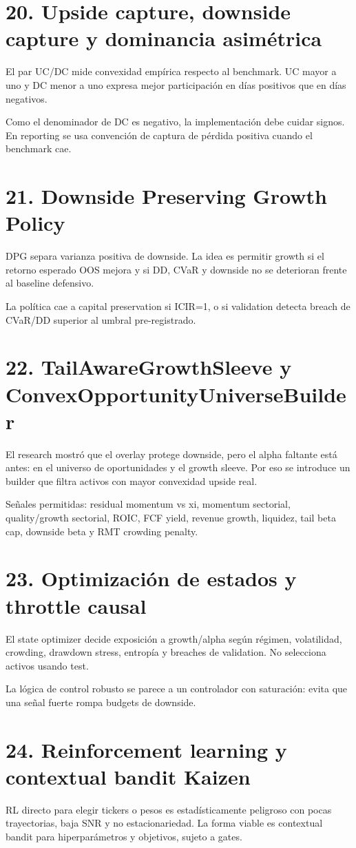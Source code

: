 \documentclass[11pt,letterpaper]{article}
\begin{document}
\section{20. Upside capture, downside capture y dominancia asimétrica}
El par UC/DC mide convexidad empírica respecto al benchmark. UC mayor a uno y DC menor a uno expresa mejor participación en días positivos que en días negativos.

Como el denominador de DC es negativo, la implementación debe cuidar signos. En reporting se usa convención de captura de pérdida positiva cuando el benchmark cae.

\section{21. Downside Preserving Growth Policy}
DPG separa varianza positiva de downside. La idea es permitir growth si el retorno esperado OOS mejora y si DD, CVaR y downside no se deterioran frente al baseline defensivo.

La política cae a capital preservation si ICIR=1, o si validation detecta breach de CVaR/DD superior al umbral pre-registrado.

\section{22. TailAwareGrowthSleeve y ConvexOpportunityUniverseBuilder}
El research mostró que el overlay protege downside, pero el alpha faltante está antes: en el universo de oportunidades y el growth sleeve. Por eso se introduce un builder que filtra activos con mayor convexidad upside real.

Señales permitidas: residual momentum vs xi, momentum sectorial, quality/growth sectorial, ROIC, FCF yield, revenue growth, liquidez, tail beta cap, downside beta y RMT crowding penalty.

\section{23. Optimización de estados y throttle causal}
El state optimizer decide exposición a growth/alpha según régimen, volatilidad, crowding, drawdown stress, entropía y breaches de validation. No selecciona activos usando test.

La lógica de control robusto se parece a un controlador con saturación: evita que una señal fuerte rompa budgets de downside.

\section{24. Reinforcement learning y contextual bandit Kaizen}
RL directo para elegir tickers o pesos es estadísticamente peligroso con pocas trayectorias, baja SNR y no estacionariedad. La forma viable es contextual bandit para hiperparámetros y objetivos, sujeto a gates.
\end{document}
